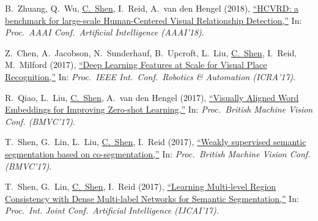 \documentclass[9pt, a4paper]{article}
\newcommand{\years}[1]{\marginnote{\scriptsize #1}}
\def\highlight{\uline}
\begin{document}
\medskip

\years{2018} B.~Zhuang, Q.~Wu, \highlight{C.~Shen}, I.~Reid, A.~van den Hengel (2018),
\href{http://www.google.com/search?lr=&ie=UTF-8&oe=UTF-8&q=HCVRD%3A+a+benchmark+for+large-scale+Human-Centered+Visual+Relationship+Detection+Bohan+Zhuang%2C+Qi+Wu%2C+Chunhua+Shen%2C+Ian+Reid%2C+Anton+van+den+Hengel}{``{HCVRD}: a benchmark for large-scale Human-Centered Visual Relationship Detection,{}''}
In: \emph{Proc.\ AAAI Conf.\  Artificial Intelligence (AAAI'18)}.

\medskip

\years{2017} Z.~Chen, A.~Jacobson, N.~Sunderhauf, B.~Upcroft, L.~Liu, \highlight{C.~Shen}, I.~Reid, M.~Milford (2017),
\href{http://www.google.com/search?lr=&ie=UTF-8&oe=UTF-8&q=Deep+Learning+Features+at+Scale+for+Visual+Place+Recognition+Zetao+Chen%2C+Adam+Jacobson%2C+Niko+Sunderhauf%2C+Ben+Upcroft%2C+Lingqiao+Liu%2C+Chunhua+Shen%2C+Ian+Reid%2C+Michael+Milford}{``Deep Learning Features at Scale for Visual Place Recognition,{}''}
In: \emph{Proc.\ IEEE Int.\ Conf.\  Robotics \& Automation (ICRA'17)}.

\medskip

\years{2017} R.~Qiao, L.~Liu, \highlight{C.~Shen}, A.~van den Hengel (2017),
\href{http://www.google.com/search?lr=&ie=UTF-8&oe=UTF-8&q=Visually+Aligned+Word+Embeddings+for+Improving+Zero-shot+Learning+Ruizhi+Qiao%2C+Lingqiao+Liu%2C+Chunhua+Shen%2C+Anton+van+den+Hengel}{``Visually Aligned Word Embeddings for Improving Zero-shot Learning,{}''}
In: \emph{Proc.\ British Machine Vision Conf. (BMVC'17)}.

\medskip

\years{2017} T.~Shen, G.~Lin, L.~Liu, \highlight{C.~Shen}, I.~Reid (2017),
\href{http://www.google.com/search?lr=&ie=UTF-8&oe=UTF-8&q=Weakly+supervised+semantic+segmentation+based+on+co-segmentation+Tong+Shen%2C+Guosheng+Lin%2C+Lingqiao+Liu%2C+Chunhua+Shen%2C+Ian+Reid}{``Weakly supervised semantic segmentation based on co-segmentation,{}''}
In: \emph{Proc.\ British Machine Vision Conf. (BMVC'17)}.

\medskip

\years{2017} T.~Shen, G.~Lin, \highlight{C.~Shen}, I.~Reid (2017),
\href{http://www.google.com/search?lr=&ie=UTF-8&oe=UTF-8&q=Learning+Multi-level+Region+Consistency+with+Dense+Multi-label+Networks+for+Semantic+Segmentation+Tong+Shen%2C+Guosheng+Lin%2C+Chunhua+Shen%2C+Ian+Reid}{``Learning Multi-level Region Consistency with Dense Multi-label Networks for Semantic Segmentation,{}''}
In: \emph{Proc.\ Int. Joint Conf.\  Artificial Intelligence (IJCAI'17)}.
\end{document}
